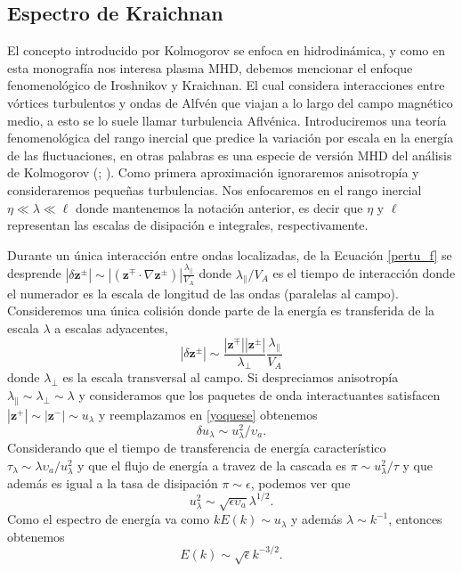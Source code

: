 \documentclass[a4paper,11pt]{report}
\begin{document}
\subsection{Espectro de Kraichnan}
El concepto introducido por Kolmogorov se enfoca en hidrodinámica, y como en esta monografía nos interesa plasma MHD, debemos mencionar el enfoque fenomenológico de Iroshnikov y Kraichnan. El cual considera interacciones entre vórtices turbulentos y ondas de Alfvén que viajan a lo largo del campo magnético medio, a esto se lo suele llamar turbulencia Aflvénica. Introduciremos una teoría fenomenológica del rango inercial que predice la variación por escala en la energía de las fluctuaciones, en otras palabras es una especie de versión MHD del análisis de Kolmogorov (\citet{iroshnikov_1964}; \citet{kraichnan_1965}). Como primera aproximación ignoraremos anisotropía y consideraremos pequeñas turbulencias. Nos enfocaremos en el rango inercial $\eta \ll \lambda \ll \ell$ donde mantenemos la notación anterior, es decir que $\eta$ y $\ell$ representan las escalas de disipación e integrales, respectivamente.

Durante un única interacción entre ondas localizadas, de la Ecuación \ref{pertu_f} se desprende $|\delta \boldsymbol{z}^\pm|\sim |(\boldsymbol{z}^\mp \cdot \nabla \boldsymbol{z}^\pm)|\frac{\lambda_{\parallel}}{V_A}$ donde $\lambda_{\parallel}/V_A$ es el tiempo de interacción donde el numerador es la escala de longitud de las ondas (paralelas al campo). Consideremos una única colisión donde parte de la energía es transferida de la escala $\lambda$ a escalas adyacentes,
\begin{equation}
  |\delta \boldsymbol{z}^\pm|\sim \frac{|\boldsymbol{z}^\mp| |\boldsymbol{z}^\pm|}{\lambda_\perp}\frac{\lambda_{\parallel}}{V_A} \label{yoquese}
\end{equation}
donde $\lambda_\perp$ es la escala transversal al campo. Si despreciamos anisotropía $\lambda_{\parallel}\sim \lambda_{\perp}\sim \lambda$ y consideramos que los paquetes de onda interactuantes satisfacen $|\boldsymbol{z}^+|\sim|\boldsymbol{z}^-|\sim u_\lambda$ y reemplazamos en \ref{yoquese} obtenemos
\begin{equation}
  \delta u_{\lambda} \sim u_{\lambda}^2/\upsilon_{a}.
\end{equation}
Considerando que el tiempo de transferencia de energía característico $\tau_{\lambda}\sim \lambda \upsilon_a/u_{\lambda}^2$ y que el flujo de energía a travez de la cascada es $\pi \sim u_{\lambda}^2/\tau$ y que además es igual a la tasa de disipación $\pi \sim \epsilon$, podemos ver que
\begin{equation}
  u_{\lambda}^2\sim \sqrt{\epsilon \upsilon_a} \lambda^{1/2}.
\end{equation}
Como el espectro de energía va como $kE(k)\sim u_{\lambda}$ y además $\lambda \sim k^{-1}$, entonces obtenemos
\begin{equation}
  E(k)\sim \sqrt{\epsilon}k^{-3/2}. \label{kraichnan}
\end{equation}
\end{document}
